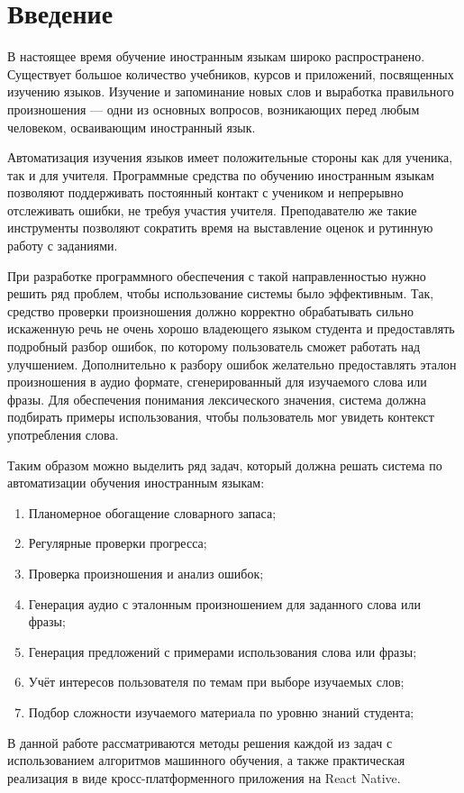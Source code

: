 \section*{Введение}
В настоящее время обучение иностранным языкам широко распространено. Существует большое количество учебников, курсов и приложений, посвященных изучению языков. Изучение и запоминание новых слов и выработка правильного произношения --- одни из основных вопросов, возникающих перед любым человеком, осваивающим иностранный язык.

Автоматизация изучения языков имеет положительные стороны как для ученика, так и для учителя. Программные средства по обучению иностранным языкам позволяют поддерживать постоянный контакт с учеником и непрерывно отслеживать ошибки, не требуя участия учителя. Преподавателю же такие инструменты позволяют сократить время на выставление оценок и рутинную работу с заданиями.

При разработке программного обеспечения с такой направленностью нужно решить ряд проблем, чтобы использование системы было эффективным. Так, средство проверки произношения должно корректно обрабатывать сильно искаженную речь не очень хорошо владеющего языком студента и предоставлять подробный разбор ошибок, по которому пользователь сможет работать над улучшением. Дополнительно к разбору ошибок желательно предоставлять эталон произношения в аудио формате, сгенерированный для изучаемого слова или фразы. Для обеспечения понимания лексического значения, система должна подбирать примеры использования, чтобы пользователь мог увидеть контекст употребления слова.

Таким образом можно выделить ряд задач, который должна решать система по автоматизации обучения иностранным языкам:
\begin{enumerate}
	\item Планомерное обогащение словарного запаса;
	\item Регулярные проверки прогресса;
	\item Проверка произношения и анализ ошибок;
	\item Генерация аудио с эталонным произношением для заданного слова или фразы;
	\item Генерация предложений с примерами использования слова или фразы;
	\item Учёт интересов пользователя по темам при выборе изучаемых слов;
	\item Подбор сложности изучаемого материала по уровню знаний студента;
\end{enumerate}
В данной работе рассматриваются методы решения каждой из задач с использованием алгоритмов машинного обучения, а также практическая реализация в виде кросс-платформенного приложения на React Native.

